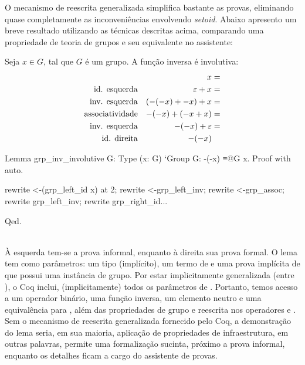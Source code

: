 O mecanismo de reescrita generalizada simplifica bastante as provas, eliminando quase completamente as inconveniências envolvendo \textit{setoid}. Abaixo apresento um breve resultado utilizando as técnicas descritas acima, comparando uma propriedade de teoria de grupos e seu equivalente no assistente:
\vspace*{.4em}\\
\begin{minipage}[t]{0.5\linewidth}
	\begin{lema}
		Seja $x \in G$, tal que $G$ é um grupo. A função inversa é involutiva:
		\begin{align*}
			& & x& =\\
			\text{\textup{id. esquerda}}& & \varepsilon + x& =\\
			\text{\textup{inv. esquerda}}& & (-(-x) + -x) + x& =\\
			\text{\textup{associatividade}}& & -(-x) + (-x + x)& =\\
			\text{\textup{inv. esquerda}}& & -(-x) + \varepsilon& =\\
			\text{\textup{id. direita}}& & -(-x) &
		\end{align*}
	\end{lema}
\end{minipage}
\hspace{.7 em}
\begin{minipage}[t]{0.5\linewidth}
	\begin{coqcode}
Lemma grp_inv_involutive {G: Type}
  (x: G) `{Group G}: -(-x) ≡@{G} x.
Proof with auto.

		
rewrite <-(grp_left_id x) at 2;
rewrite <-grp_left_inv;
rewrite <-grp_assoc;
rewrite grp_left_inv;
rewrite grp_right_id...
		
Qed.
	\end{coqcode}
\end{minipage}\vspace*{.6em}\\
À esquerda tem-se a prova informal, enquanto à direita sua prova formal. O lema  tem como parâmetros: um tipo  (implícito), um termo  de  e uma prova implícita de que  possui uma instância de grupo. Por estar implicitamente generalizada (entre ), o Coq inclui, (implicitamente) todos os parâmetros de . Portanto, temos acesso a um operador binário, uma função inversa, um elemento neutro e uma equivalência para , além das propriedades de grupo e reescrita nos operadores \coqinline{+} e \coqinline{-}. Sem o mecanismo de reescrita generalizada fornecido pelo Coq, a demonstração do lema seria, em sua maioria, aplicação de propriedades de infraestrutura, em outras palavras, 
permite uma formalização sucinta, próximo a prova informal, enquanto os detalhes ficam a cargo do assistente de provas.
